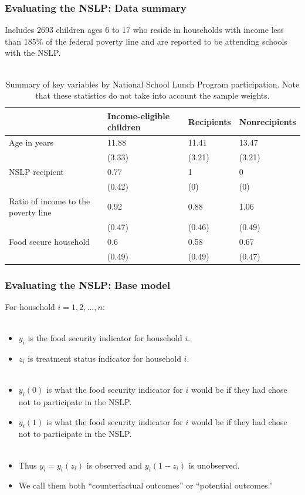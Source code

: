 \documentclass[xcolor=dvipsnames]{beamer}
\begin{document}
\begin{frame}[fragile]
\frametitle{Evaluating the NSLP: Data summary}

Includes 2693 children ages 6 to 17 who reside in households with income less than 185\% of the federal poverty line and are reported to be attending schools with the NSLP.\\~\\
  
\begin{table}[!ht]
\centering
{\scriptsize
\begin{tabular}{llll}
  \hline
  & Income-eligible children & Recipients & Nonrecipients \\ 
  \hline
Age in years & 11.88 & 11.41 & 13.47 \\ 
   & (3.33) & (3.21) & (3.21) \\ 
  NSLP recipient & 0.77 & 1 & 0 \\ 
   & (0.42) & (0) & (0) \\ 
  Ratio of income to the poverty line & 0.92 & 0.88 & 1.06 \\ 
   & (0.47) & (0.46) & (0.49) \\ 
  Food secure household & 0.6 & 0.58 & 0.67 \\ 
   & (0.49) & (0.49) & (0.47) \\ 
   \hline
\end{tabular}
}
\caption{Summary of key variables by National School Lunch Program participation. Note that these statistics do not take into account the sample weights.} 
\label{dattab}
\end{table}



\end{frame}

\begin{frame}
  \frametitle{Evaluating the NSLP: Base model}
  For household $i=1,2,...,n$:\\~\\
\begin{itemize}
  \item $y_i$ is the food security indicator for household $i$. 
  \item $z_i$ is treatment status indicator for household $i$.\pause\\~
  \item $y_i(0)$ is what the food security indicator for $i$ would be if they had chose not to participate in the NSLP.
  \item $y_i(1)$ is what the food security indicator for $i$ would be if they had chose not to participate in the NSLP.\pause\\~
  \item Thus $y_i = y_i(z_i)$ is observed and $y_i(1-z_i)$ is unobserved. 
  \item We call them both ``counterfactual outcomes'' or ``potential outcomes.''
\end{itemize}
\end{frame}
\end{document}
